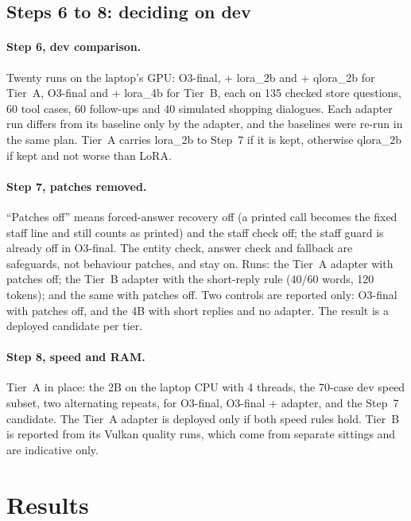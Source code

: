 \documentclass[11pt,a4paper]{article}
\begin{document}
\subsection{Steps 6 to 8: deciding on dev}
\paragraph{Step 6, dev comparison.} Twenty runs on the laptop's GPU: O3-final, + lora\_2b and + qlora\_2b for Tier~A,
O3-final and + lora\_4b for Tier~B, each on 135 checked store questions, 60 tool cases, 60 follow-ups and 40 simulated
shopping dialogues. Each adapter run differs from its baseline only by the adapter, and the baselines were re-run in the same
plan. Tier~A carries lora\_2b to Step~7 if it is kept, otherwise qlora\_2b if kept and not worse than LoRA.

\paragraph{Step 7, patches removed.} ``Patches off'' means forced-answer recovery off (a printed call becomes the fixed
staff line and still counts as printed) and the staff check off; the staff guard is already off in O3-final. The entity
check, answer check and fallback are safeguards, not behaviour patches, and stay on. Runs: the Tier~A adapter with patches
off; the Tier~B adapter with the short-reply rule (40/60 words, 120 tokens); and the same with patches off. Two controls are
reported only: O3-final with patches off, and the 4B with short replies and no adapter. The result is a deployed candidate
per tier.

\paragraph{Step 8, speed and RAM.} Tier~A in place: the 2B on the laptop CPU with 4 threads, the 70-case dev speed subset,
two alternating repeats, for O3-final, O3-final + adapter, and the Step~7 candidate. The Tier~A adapter is deployed only
if both speed rules hold. Tier~B is reported from its Vulkan quality runs, which come from separate sittings and are
indicative only.

\section{Results}\label{sec:results}
\end{document}
